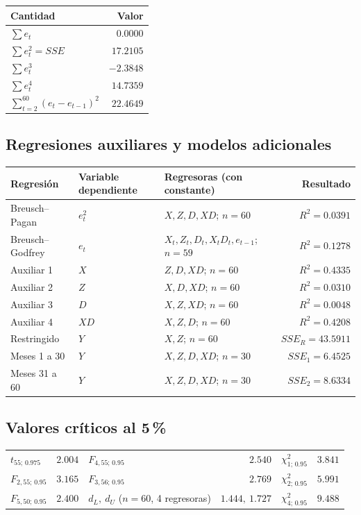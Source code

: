 \begin{center}
\begin{tabular}{@{}lr@{}}
\toprule
Cantidad & Valor\\
\midrule
$\sum e_t$ & $0.0000$\\
$\sum e_t^2=SSE$ & $17.2105$\\
$\sum e_t^3$ & $-2.3848$\\
$\sum e_t^4$ & $14.7359$\\
$\sum_{t=2}^{60}(e_t-e_{t-1})^2$ & $22.4649$\\
\bottomrule
\end{tabular}
\end{center}

\subsection*{Regresiones auxiliares y modelos adicionales}

\begin{center}
\begin{tabular}{@{}lllr@{}}
\toprule
Regresión & Variable dependiente & Regresoras (con constante) & Resultado\\
\midrule
Breusch--Pagan & $e_t^2$ & $X,Z,D,XD$; $n=60$ & $R^2=0.0391$\\
Breusch--Godfrey & $e_t$ & $X_t,Z_t,D_t,X_tD_t,e_{t-1}$; $n=59$ & $R^2=0.1278$\\
Auxiliar 1 & $X$ & $Z,D,XD$; $n=60$ & $R^2=0.4335$\\
Auxiliar 2 & $Z$ & $X,D,XD$; $n=60$ & $R^2=0.0310$\\
Auxiliar 3 & $D$ & $X,Z,XD$; $n=60$ & $R^2=0.0048$\\
Auxiliar 4 & $XD$ & $X,Z,D$; $n=60$ & $R^2=0.4208$\\
Restringido & $Y$ & $X,Z$; $n=60$ & $SSE_R=43.5911$\\
Meses 1 a 30 & $Y$ & $X,Z,D,XD$; $n=30$ & $SSE_1=6.4525$\\
Meses 31 a 60 & $Y$ & $X,Z,D,XD$; $n=30$ & $SSE_2=8.6334$\\
\bottomrule
\end{tabular}
\end{center}

\subsection*{Valores críticos al 5\,\%}

\begin{center}
\begin{tabular}{@{}lr@{\qquad}lr@{\qquad}lr@{}}
\toprule
$t_{55;\,0.975}$ & $2.004$ & $F_{4,55;\,0.95}$ & $2.540$ & $\chi^2_{1;\,0.95}$ & $3.841$\\
$F_{2,55;\,0.95}$ & $3.165$ & $F_{3,56;\,0.95}$ & $2.769$ & $\chi^2_{2;\,0.95}$ & $5.991$\\
$F_{5,50;\,0.95}$ & $2.400$ & $d_L,\ d_U$ ($n=60$, 4 regresoras) & $1.444,\ 1.727$ & $\chi^2_{4;\,0.95}$ & $9.488$\\
\bottomrule
\end{tabular}
\end{center}

